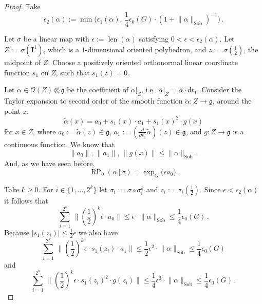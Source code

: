 \documentclass[10pt, a4paper]{amsart}
\theoremstyle{definition}
\numberwithin{equation}{section}
\newcommand{\opn}{\operatorname}
\newcommand{\mfrak}[1]{\mathfrak{#1}}
\newcommand{\mcal}[1]{\mathcal{#1}}
\newcommand{\mbf}[1]{\mathbf{#1}}
\newcommand{\mrm}[1]{\mathrm{#1}}
\newcommand{\smfrac}[2]{{\textstyle \frac{#1}{#2}}}
\newcommand{\til}[1]{\tilde{#1}}
\newcommand{\norm}[1]{\lVert #1 \rVert}
\newcommand{\abs}[1]{\lvert #1 \rvert}
\renewcommand{\vert}{\, | \,}
\newcommand{\g}{\mfrak{g}}
\renewcommand{\d}{\mrm{d}}
\begin{document}
\begin{proof}\item
Take
\[ \epsilon_2(\alpha) := \min \bigl( \epsilon_1(\alpha), \,
\smfrac{1}{4} \epsilon_0(G) \cdot (1 + \norm{\alpha}_{\mrm{Sob}})^{-1} 
\bigr) \, . \]

Let $\sigma$ be a linear map with $\epsilon := \opn{len}(\alpha)$ satisfying
$0 < \epsilon < \epsilon_2(\alpha)$.
Let $Z := \sigma(\mbf{I}^{1})$, which is a $1$-dimensional oriented polyhedron,
and $z := \sigma(\smfrac{1}{2})$, the midpoint of $Z$.
Choose a positively oriented orthonormal linear coordinate function $s_1$
on $Z$, such that $s_1(z) = 0$.

Let $\til{\alpha} \in \mcal{O}(Z) \otimes \g$ be the coefficient of
$\alpha|_Z$, i.e.\ 
$\alpha|_Z = \til{\alpha} \cdot \d t_1$. 
Consider the Taylor expansion to second order of the smooth function
$\til{\alpha} : Z \to \g$, around the point $z$:
\begin{equation} \label{eqn:67}
\til{\alpha}(x) =  a_0 + s_1(x) \cdot a_1 + s_1(x)^2 \cdot g(x) 
\end{equation}
for $x \in Z$, where
$a_0 := \til{\alpha}(z) \in \g$,
$a_1 := (\smfrac{\partial}{\partial s_1} \til{\alpha})(z) \in \g$,
and $g : Z \to \g$ is a continuous function.
We know that
\begin{equation*} 
\norm{a_0} , \,
\norm{a_1} , \,
\norm{g(x)} \leq \norm{\alpha}_{\mrm{Sob}}  \, .
\end{equation*}
And, as we have seen before, 
\begin{equation} \label{eqn:71}
 \opn{RP}_{0}(\alpha \vert \sigma) = 
\opn{exp}_G \bigl(  \epsilon a_0 \bigr) .
\end{equation}

Take $k \geq 0$. For $i \in \{ 1, \ldots, 2^k \}$ let
$\sigma_i := \sigma \circ \sigma^k_i$ and
$z_i := \sigma_i(\smfrac{1}{2})$. 
Since 
$\epsilon < \epsilon_2(\alpha)$ it follows that 
\begin{equation} \label{eqn:66}
\sum_{i = 1}^{2^k} \,
\norm{ (\smfrac{1}{2})^k \epsilon \cdot a_0 } 
\leq \epsilon \cdot \norm{\alpha}_{\mrm{Sob}} \leq \smfrac{1}{4} \epsilon_0(G)
\, .
\end{equation}
Because  
$\abs{ s_1(z_i) } \leq  \smfrac{1}{2} \epsilon$ we also have
\begin{equation} \label{eqn:10}
\sum_{i = 1}^{2^k} \,
\norm{ (\smfrac{1}{2})^k \epsilon \cdot s_1(z_i) \cdot a_1 } 
\leq \smfrac{1}{2} \epsilon^2 \cdot \norm{\alpha}_{\mrm{Sob}}
\leq \smfrac{1}{4} \epsilon_0(G) 
\end{equation}
and 
\begin{equation} \label{eqn:8}
\sum_{i = 1}^{2^k} \,
\norm{ (\smfrac{1}{2})^k \epsilon \cdot s_1(z_i)^2 \cdot g(z_i) } 
\leq \smfrac{1}{4} \epsilon^3  \cdot \norm{\alpha}_{\mrm{Sob}}
\leq \smfrac{1}{4} \epsilon_0(G) \, .
\end{equation}


\end{proof}
\end{document}
